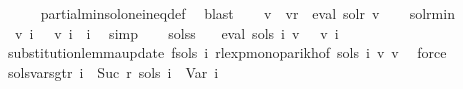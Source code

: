 \begin{isabellebody}
\ \ \ \ \isamarkupfalse%
\ partial{\isacharunderscore}{\kern0pt}min{\isacharunderscore}{\kern0pt}sol{\isacharunderscore}{\kern0pt}one{\isacharunderscore}{\kern0pt}ineq{\isacharunderscore}{\kern0pt}def\ \isamarkupfalse%
\ blast\isanewline
\ \ \isamarkupfalse%
\ {\isacharquery}{\kern0pt}v{\isacharprime}{\kern0pt}\ {\isacharequal}{\kern0pt}\ {\isachardoublequoteopen}v{}{\isacharparenleft}{\kern0pt}r\ {\isacharcolon}{\kern0pt}{\isacharequal}{\kern0pt}\ eval\ sol{\isacharunderscore}{\kern0pt}r\ v{}{\isacharparenright}{\kern0pt}{\isachardoublequoteclose}\isanewline
\ \ \isamarkupfalse%
\ sol{\isacharunderscore}{\kern0pt}r{\isacharunderscore}{\kern0pt}min\ \isamarkupfalse%
\ {\isachardoublequoteopen}{\isasymPsi}\ {\isacharparenleft}{\kern0pt}{\isacharquery}{\kern0pt}v{\isacharprime}{\kern0pt}\ i{\isacharparenright}{\kern0pt}\ {\isasymsubseteq}\ {\isasymPsi}\ {\isacharparenleft}{\kern0pt}v{}\ i{\isacharparenright}{\kern0pt}{\isachardoublequoteclose}\ \ i\ \isamarkupfalse%
\ simp\isanewline
\ \ \isamarkupfalse%
\ sols{\isacharunderscore}{\kern0pt}s{}\ \isamarkupfalse%
\ {\isachardoublequoteopen}{\isasymPsi}\ {\isacharparenleft}{\kern0pt}eval\ {\isacharparenleft}{\kern0pt}sols{\isacharprime}{\kern0pt}\ i{\isacharparenright}{\kern0pt}\ v{}{\isacharparenright}{\kern0pt}\ {\isasymsubseteq}\ {\isasymPsi}\ {\isacharparenleft}{\kern0pt}v{}\ i{\isacharparenright}{\kern0pt}{\isachardoublequoteclose}\isanewline
\ \ \ \ \isamarkupfalse%
\ substitution{\isacharunderscore}{\kern0pt}lemma{\isacharunderscore}{\kern0pt}update{\isacharbrackleft}{\kern0pt}\ f{\isacharequal}{\kern0pt}{\isachardoublequoteopen}sols\ i{\isachardoublequoteclose}{\isacharbrackright}{\kern0pt}\ rlexp{\isacharunderscore}{\kern0pt}mono{\isacharunderscore}{\kern0pt}parikh{\isacharbrackleft}{\kern0pt}of\ {\isachardoublequoteopen}sols\ i{\isachardoublequoteclose}\ {\isacharquery}{\kern0pt}v{\isacharprime}{\kern0pt}\ v{}{\isacharbrackright}{\kern0pt}\ \isamarkupfalse%
\ force\isanewline
{}\isamarkupfalse%
%
\endisatagproof
{\isafoldproof}%
%
\isadelimproof
\isanewline
%
\endisadelimproof
\isanewline
{}\isamarkupfalse%
\ sols{\isacharprime}{\kern0pt}{\isacharunderscore}{\kern0pt}vars{\isacharunderscore}{\kern0pt}gt{\isacharunderscore}{\kern0pt}r{\isacharcolon}{\kern0pt}\ {\isachardoublequoteopen}{\isasymforall}i\ {\isasymge}\ Suc\ r{\isachardot}{\kern0pt}\ sols{\isacharprime}{\kern0pt}\ i\ {\isacharequal}{\kern0pt}\ Var\ i{\isachardoublequoteclose}\isanewline

\end{isabellebody}
